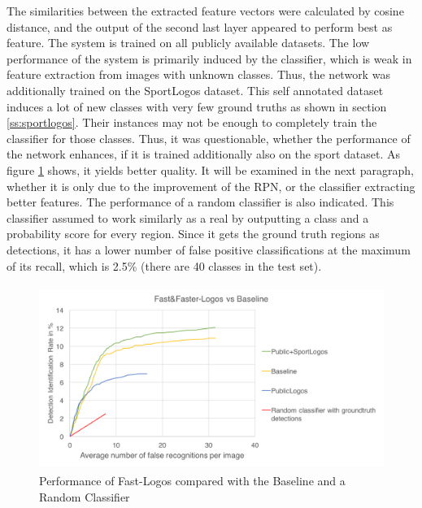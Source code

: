 The similarities between the extracted feature vectors were calculated by cosine distance, and the output of the second last layer appeared to perform best as feature. The system is trained on all publicly available datasets. The low performance of the system is primarily induced by the classifier, which is weak in feature extraction from images with unknown classes. Thus, the network was additionally trained on the SportLogos dataset. This self annotated dataset induces a lot of new classes with very few ground truths as shown in section \ref{ss:sportlogos}. Their instances may not be enough to completely train the classifier for those classes. Thus, it was questionable, whether the performance of the network enhances, if it is trained additionally also on the sport dataset. As figure \ref{f:sol2} shows, it yields better quality. It will be examined in the next paragraph, whether it is only due to the improvement of the RPN, or the classifier extracting better features. The performance of a random classifier is also indicated. This classifier assumed to work similarly as a real by outputting a class and a probability score for every region. Since it gets the ground truth regions as detections, it has a lower number of false positive classifications at the maximum of its recall, which is 2.5\% (there are 40 classes in the test set).
\begin{figure}
  \centering
  \includegraphics[height=60mm]{images/mt/sol2.png}
  \caption{Performance of Fast-Logos compared with the Baseline and a Random Classifier}
  \label{f:sol2}
\end{figure}

